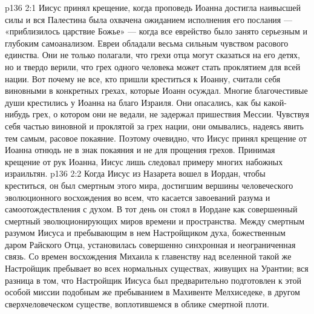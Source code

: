 \vs p136 2:1 Иисус принял крещение, когда проповедь Иоанна достигла наивысшей силы и вся Палестина была охвачена ожиданием исполнения его послания --- «приблизилось царствие Божье» --- когда все еврейство было занято серьезным и глубоким самоанализом. Евреи обладали весьма сильным чувством расового единства. Они не только полагали, что грехи отца могут сказаться на его детях, но и твердо верили, что грех одного человека может стать проклятием для всей нации. Вот почему не все, кто пришли креститься к Иоанну, считали себя виновными в конкретных грехах, которые Иоанн осуждал. Многие благочестивые души крестились у Иоанна на благо Израиля. Они опасались, как бы какой\hyp{}нибудь грех, о котором они не ведали, не задержал пришествия Мессии. Чувствуя себя частью виновной и проклятой за грех нации, они омывались, надеясь явить тем самым, расовое покаяние. Поэтому очевидно, что Иисус принял крещение от Иоанна отнюдь не в знак покаяния и не для прощения грехов. Принимая крещение от рук Иоанна, Иисус лишь следовал примеру многих набожных израильтян.
\vs p136 2:2 \pc Когда Иисус из Назарета вошел в Иордан, чтобы креститься, он был смертным этого мира, достигшим вершины человеческого эволюционного восхождения во всем, что касается завоеваний разума и самоотождествления с духом. В тот день он стоял в Иордане как совершенный смертный эволюционирующих миров времени и пространства. Между смертным разумом Иисуса и пребывающим в нем Настройщиком духа, божественным даром Райского Отца, установилась совершенно синхронная и неограниченная связь. Со времен восхождения Михаила к главенству над вселенной такой же Настройщик пребывает во всех нормальных существах, живущих на Урантии; вся разница в том, что Настройщик Иисуса был предварительно подготовлен к этой особой миссии подобным же пребыванием в Махивенте Мелхиседеке, в другом сверхчеловеческом существе, воплотившемся в облике смертной плоти.
